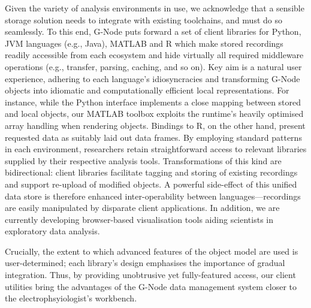 \documentclass[a4paper]{article}
\begin{document}
Given the variety of analysis environments in use, we acknowledge that
a sensible storage solution needs to integrate with existing
toolchains, and must do so seamlessly. To this end, G-Node puts
forward a set of client libraries for Python, JVM languages (e.g.,
Java), MATLAB and R which make stored recordings readily accessible
from each ecosystem and hide virtually all required middleware
operations (e.g., transfer, parsing, caching, and so on). Key aim is a
natural user experience, adhering to each language's idiosyncracies
and transforming G-Node objects into idiomatic and computationally
efficient local representations. For instance, while the Python
interface implements a close mapping between stored and local objects,
our MATLAB toolbox exploits the runtime's heavily optimised array
handling when rendering objects. Bindings to R, on the other hand,
present requested data as suitably laid out data frames. By employing
standard patterns in each environment, researchers retain
straightforward access to relevant libraries supplied by their
respective analysis tools. Transformations of this kind are
bidirectional: client libraries facilitate tagging and storing of
existing recordings and support re-upload of modified objects. A
powerful side-effect of this unified data store is therefore enhanced
inter-operability between languages---recordings are easily
manipulated by disparate client applications. In addition, we are
currently developing browser-based visualisation tools aiding
scientists in exploratory data analysis.

Crucially, the extent to which advanced features of the object model
are used is user-determined; each library's design emphasises the
importance of gradual integration. Thus, by providing unobtrusive yet
fully-featured access, our client utilities bring the advantages of
the G-Node data management system closer to the electrophsyiologist's
workbench.
\end{document}
